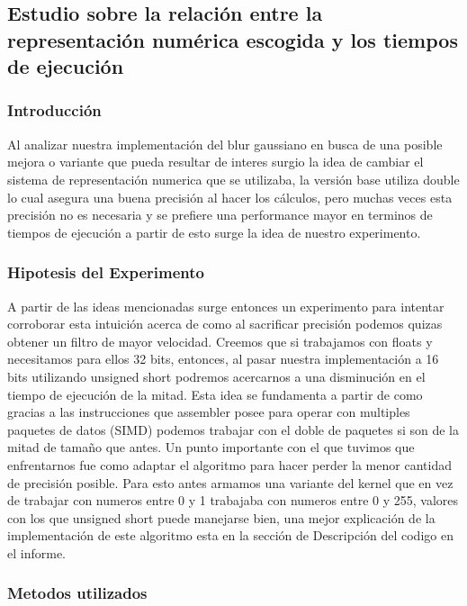 \subsection{Estudio sobre la relación entre la representación numérica escogida y los tiempos de ejecución}
\label{subsec:resultados2}

\subsubsection{Introducción}

Al analizar nuestra implementación del blur gaussiano en busca de una posible
mejora o variante que pueda resultar de interes surgio la idea de cambiar el
sistema de representación numerica que se utilizaba, la versión base utiliza
double lo cual asegura una buena precisión al hacer los cálculos, pero muchas
veces esta precisión no es necesaria y se prefiere una performance mayor en
terminos de tiempos de ejecución a partir de esto surge la idea de nuestro
experimento.

\subsubsection{Hipotesis del Experimento}

A partir de las ideas mencionadas surge entonces un experimento para intentar
corroborar esta intuición acerca de como al sacrificar precisión podemos quizas
obtener un filtro de mayor velocidad. Creemos que si trabajamos con floats y
necesitamos para ellos 32 bits, entonces, al pasar nuestra implementación a 16
bits utilizando unsigned short podremos acercarnos a una disminución en el
tiempo de ejecución de la mitad. Esta idea se fundamenta a partir de como
gracias a las instrucciones que assembler posee para operar con multiples
paquetes de datos (SIMD) podemos trabajar con el doble de paquetes si son de la
mitad de tamaño que antes. Un punto importante con el que tuvimos que
enfrentarnos fue como adaptar el algoritmo para hacer perder la menor cantidad
de precisión posible. Para esto antes armamos una variante del kernel que en vez
de trabajar con numeros entre 0 y 1 trabajaba con numeros entre 0 y 255, valores
con los que unsigned short puede manejarse bien, una mejor explicación de la
implementación de este algoritmo esta en la sección de Descripción del codigo en
el informe.

\subsubsection{Metodos utilizados}

